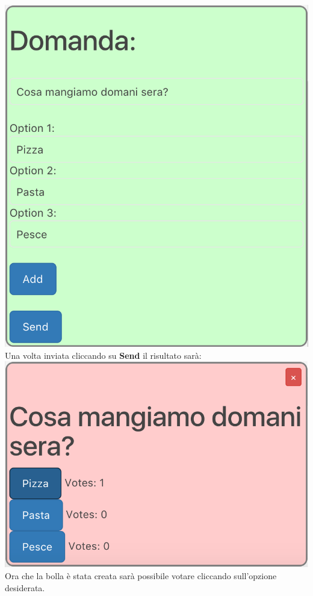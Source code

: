 \includegraphics[scale=0.75]{img/pollConfig.png}
\\
Una volta inviata cliccando su \textbf{Send} il risultato sarà:\\

\includegraphics[scale=0.74]{img/poll.png}
\\
Ora che la bolla è stata creata sarà possibile votare cliccando sull'opzione desiderata.

